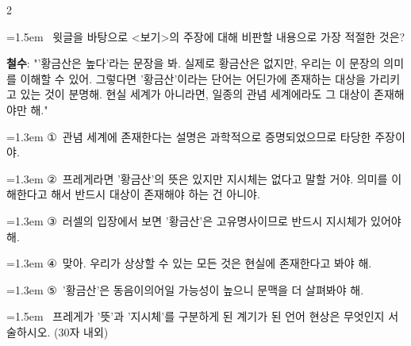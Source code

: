 \documentclass[10pt, a4paper]{article}
\begin{document}
\begin{multicols}{2}
\noindent\begin{minipage}{\columnwidth}
\vspace{2mm}
{\hangindent=1.5em  ~윗글을 바탕으로 <보기>의 주장에 대해 비판할 내용으로 가장 적절한 것은?\par}

\vspace{1mm}
\begin{boxibox}
\textbf{철수}: "'황금산은 높다'라는 문장을 봐. 실제로 황금산은 없지만, 우리는 이 문장의 의미를 이해할 수 있어. 그렇다면 '황금산'이라는 단어는 어딘가에 존재하는 대상을 가리키고 있는 것이 분명해. 현실 세계가 아니라면, 일종의 관념 세계에라도 그 대상이 존재해야만 해." \\
\end{boxibox}
\vspace{1mm}

\vspace{0.5mm}
{\hangindent=1.3em  \noindent\hspace{0.3em}①~관념 세계에 존재한다는 설명은 과학적으로 증명되었으므로 타당한 주장이야.\par}
{\hangindent=1.3em  \noindent\hspace{0.3em}②~프레게라면 '황금산'의 뜻은 있지만 지시체는 없다고 말할 거야. 의미를 이해한다고 해서 반드시 대상이 존재해야 하는 건 아니야.\par}
{\hangindent=1.3em  \noindent\hspace{0.3em}③~러셀의 입장에서 보면 '황금산'은 고유명사이므로 반드시 지시체가 있어야 해.\par}
{\hangindent=1.3em  \noindent\hspace{0.3em}④~맞아. 우리가 상상할 수 있는 모든 것은 현실에 존재한다고 봐야 해.\par}
{\hangindent=1.3em  \noindent\hspace{0.3em}⑤~'황금산'은 동음이의어일 가능성이 높으니 문맥을 더 살펴봐야 해.\par}
\vspace{4mm}
\end{minipage}
\par

\noindent\begin{minipage}{\columnwidth}
\vspace{2mm}
{\hangindent=1.5em  ~프레게가 '뜻'과 '지시체'를 구분하게 된 계기가 된 언어 현상은 무엇인지 서술하시오. (30자 내외)\par}


\end{minipage}
\end{multicols}
\end{document}
